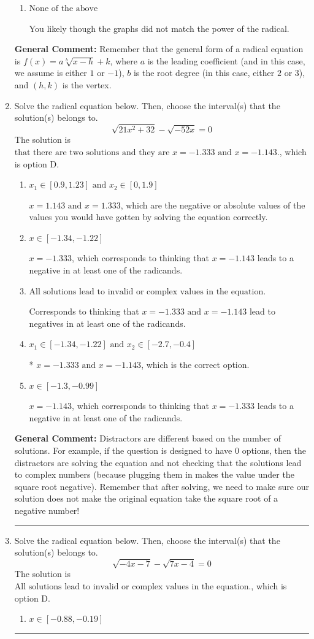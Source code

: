 \documentclass{extbook}[14pt]
\newcommand{\litem}[1]{\item #1

\rule{\textwidth}{0.4pt}}
\begin{document}
\begin{enumerate}
{\begin{enumerate}[label=\Alph*.]
This corresponds to switching the coefficient and having the correct vertex with the root degree as $3$.
\item \( \text{None of the above} \)

You likely though the graphs did not match the power of the radical.
\end{enumerate}

\textbf{General Comment:} Remember that the general form of a radical equation is $ f(x) = a \sqrt[b]{x - h} + k$, where $a$ is the leading coefficient (and in this case, we assume is either $1$ or $-1$), $b$ is the root degree (in this case, either $2$ or $3$), and $(h, k)$ is the vertex.
}
\litem{
Solve the radical equation below. Then, choose the interval(s) that the solution(s) belongs to.
\[ \sqrt{21 x^2 + 32} - \sqrt{-52 x} = 0 \]The solution is \( \text{that there are two solutions and they are } x = -1.333 \text{ and } x = -1.143. \), which is option D.\begin{enumerate}[label=\Alph*.]
\item \( x_1 \in [0.9, 1.23] \text{ and } x_2 \in [0,1.9] \)

$x = 1.143 \text{ and } x = 1.333$, which are the negative or absolute values of the values you would have gotten by solving the equation correctly.
\item \( x \in [-1.34,-1.22] \)

$x = -1.333$, which corresponds to thinking that $x = -1.143$ leads to a negative in at least one of the radicands.
\item \( \text{All solutions lead to invalid or complex values in the equation.} \)

Corresponds to thinking that $x = -1.333 \text{ and } x = -1.143$ lead to negatives in at least one of the radicands.
\item \( x_1 \in [-1.34, -1.22] \text{ and } x_2 \in [-2.7,-0.4] \)

* $x = -1.333 \text{ and } x = -1.143$, which is the correct option.
\item \( x \in [-1.3,-0.99] \)

$x = -1.143$, which corresponds to thinking that $x = -1.333$ leads to a negative in at least one of the radicands.
\end{enumerate}

\textbf{General Comment:} Distractors are different based on the number of solutions. For example, if the question is designed to have 0 options, then the distractors are solving the equation and not checking that the solutions lead to complex numbers (because plugging them in makes the value under the square root negative). Remember that after solving, we need to make sure our solution does not make the original equation take the square root of a negative number!
}
\litem{
Solve the radical equation below. Then, choose the interval(s) that the solution(s) belongs to.
\[ \sqrt{-4 x - 7} - \sqrt{7 x - 4} = 0 \]The solution is \( \text{All solutions lead to invalid or complex values in the equation.} \), which is option D.\begin{enumerate}[label=\Alph*.]
\item \( x \in [-0.88,-0.19] \)


\end{enumerate}}
\end{enumerate}
\end{document}
